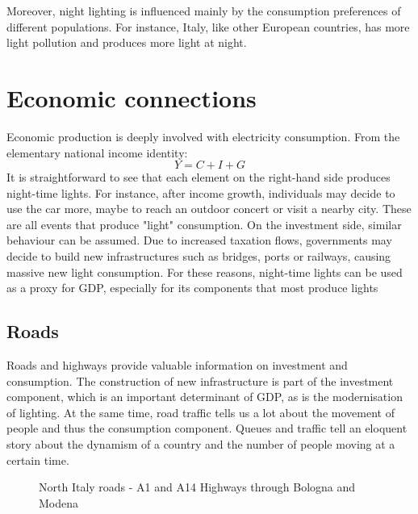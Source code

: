 Moreover, night lighting is influenced mainly by the consumption preferences of different populations. For instance, Italy, like other European countries, has more light pollution and produces more light at night.

\section{Economic connections}
Economic production is deeply involved with electricity consumption. From the elementary
national income identity:
\begin{equation}
    Y=C+I+G
\end{equation}
It is straightforward to see that each element on the right-hand side produces night-time lights. For 
instance, after income growth, individuals may decide to use the car more, maybe to reach an 
outdoor concert or visit a nearby city. These are all events that produce "light" consumption.
On the investment side, similar behaviour can be assumed. Due to increased taxation flows, 
governments may decide to build new infrastructures such as bridges, ports or railways, causing 
massive new light consumption. 
For these reasons, night-time lights can be used as a proxy for GDP, especially for its components
that most produce lights
\subsection{Roads}
Roads and highways provide valuable information on investment and consumption. The construction of new infrastructure is part of the investment component, which is an important determinant of GDP, as is the modernisation of lighting.
At the same time, road traffic tells us a lot about the movement of people and thus the consumption component. Queues and traffic tell an eloquent story about the dynamism of a country and the number of people moving at a certain time.


\begin{figure}[h!]
    \centering
    \qquad
    \caption{North Italy roads - A1 and A14 Highways through Bologna and Modena}%
    \label{fig:northitalyroads}
\end{figure}

